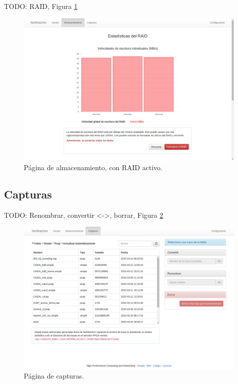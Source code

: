 TODO: RAID, Figura \ref{fig:captura:raid}
\begin{figure}[H]
  \centering
  \includegraphics[width=\textwidth,clip=true]{graphics/capturas/almacenamiento_raid}
  \caption{Página de almacenamiento, con \gls{RAID} activo.}
  \label{fig:captura:raid}
\end{figure}


\subsection{Capturas\label{extra:manual:capturas}}

TODO: Renombrar, convertir <->, borrar, Figura \ref{fig:captura:capturas}
\begin{figure}[H]
  \centering
  \includegraphics[width=\textwidth,clip=true]{graphics/capturas/capturas}
  \caption{Página de capturas.}
  \label{fig:captura:capturas}
\end{figure}


